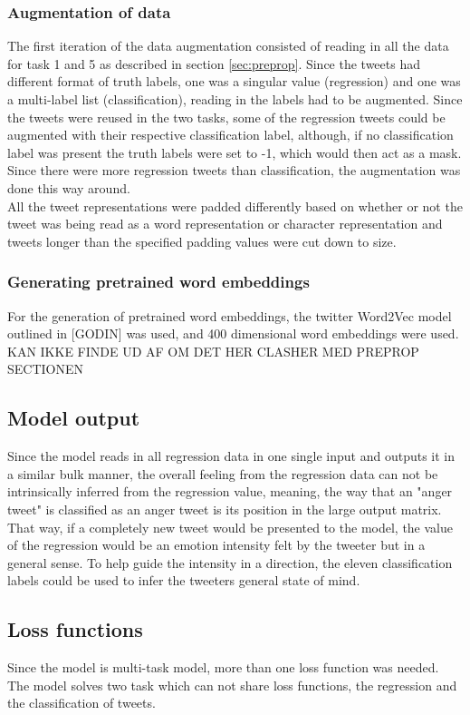 \subsubsection{Augmentation of data} \label{sec:augm}
The first iteration of the data augmentation consisted of reading in all the data for task 1 and 5 as described in section \ref{sec:preprop}. Since the tweets had different format of truth labels, one was a singular value (regression) and one was a multi-label list (classification), reading in the labels had to be augmented. Since the tweets were reused in the two tasks, some of the regression tweets could be augmented with their respective classification label, although, if no classification label was present the truth labels were set to -1, which would then act as a mask. Since there were more regression tweets than classification, the augmentation was done this way around.\\
All the tweet representations were padded differently based on whether or not the tweet was being read as a word representation or character representation and tweets longer than the specified padding values were cut down to size. 

\subsubsection{Generating pretrained word embeddings}
For the generation of pretrained word embeddings, the twitter Word2Vec model outlined in [GODIN] was used, and 400 dimensional word embeddings were used.\\
KAN IKKE FINDE UD AF OM DET HER CLASHER MED PREPROP SECTIONEN

\subsection{Model output}
Since the model reads in all regression data in one single input and outputs it in a similar bulk manner, the overall feeling from the regression data can not be intrinsically inferred from the regression value, meaning, the way that an "anger tweet" is classified as an anger tweet is its position in the large output matrix. That way, if a completely new tweet would be presented to the model, the value of the regression would be an emotion intensity felt by the tweeter but in a general sense. To help guide the intensity in a direction, the eleven classification labels could be used to infer the tweeters general state of mind. 

\subsection{Loss functions}
Since the model is multi-task model, more than one loss function was needed. The model solves two task which can not share loss functions, the regression and the classification of tweets.

